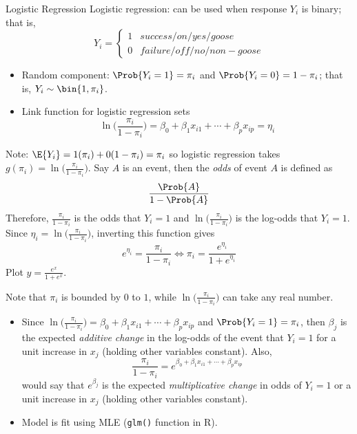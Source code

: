 \begin{Example}{Logistic Regression}{}
    Logistic regression: can be used when response $ Y_i $ is
    binary; that is,
    \[ Y_i =\begin{cases*}
            1 & success/on/yes/goose     \\
            0 & failure/off/no/non-goose
        \end{cases*} \]
    \begin{itemize}
        \item Random component: $ \Prob{Y_i=1}=\pi_i $ and
              $ \Prob{Y_i=0}=1-\pi_i $; that is,
              $ Y_i \sim \bin{1,\pi_i} $.
        \item Link function for logistic regression sets
              \[ \ln\biggl(\frac{\pi_i}{1-\pi_i} \biggr)=
                  \beta_0+\beta_1x_{i1}+\cdots+\beta_p x_{i p}=\eta_i \]
    \end{itemize}
    Note: $ \E{Y_i}=1(\pi_i)+0(1-\pi_i)=\pi_i $ so logistic regression
    takes $ \displaystyle g(\pi_i)=\ln\biggl(\frac{\pi_i}{1-\pi_i}\biggr) $.
    Say $ A $ is an event, then the \emph{odds} of event $ A $ is defined as
    \[ \frac{\Prob{A}}{1-\Prob{A}} \]
    Therefore, $ \displaystyle \frac{\pi_i}{1-\pi_i} $ is the odds that
    $ Y_i=1 $ and $ \displaystyle \ln\biggl(\frac{\pi_i}{1-\pi_i}\biggr) $
    is the log-odds that $ Y_i=1 $. Since
    $ \displaystyle \eta_i=\ln\biggl(\frac{\pi_i}{1-\pi_i}\biggr) $,
    inverting this function gives
    \[ e^{\eta_i}=\frac{\pi_i}{1-\pi_i}\iff \pi_i=\frac{e^{\eta_i}}{1+e^{\eta_i}} \]
    Plot $ \displaystyle y=\frac{e^x}{1+e^x} $.

    Note that $ \pi_i $ is bounded by $ 0 $ to $ 1 $, while
    $ \displaystyle \ln\biggl(\frac{\pi_i}{1-\pi_i}\biggr) $
    can take any real number.
    \begin{itemize}
        \item Since $ \displaystyle \ln\biggl(\frac{\pi_i}{1-\pi_i}\biggr)=
                  \beta_0+\beta_1x_{i1}+\cdots+\beta_p x_{i p} $
              and $ \Prob{Y_i=1}=\pi_i $, then $ \beta_j $ is
              the expected \emph{additive change} in the log-odds of the event that $ Y_i=1 $
              for a unit increase in $ x_j $ (holding other variables constant).
              Also,
              \[ \frac{\pi_i}{1-\pi_i}=e^{\beta_0+\beta_1x_{i1}+\cdots+\beta_p x_{i p}}  \]
              would say that $ e^{\beta_j} $ is the expected \emph{multiplicative change}
              in odds of $ Y_i=1 $ or a unit increase in $ x_j $ (holding other variables constant).
        \item Model is fit using MLE (\texttt{glm()} function in R).
    \end{itemize}
\end{Example}
